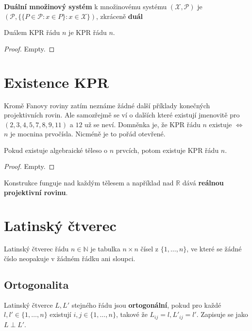 \begin{definice}
	\textbf{Duální množinový systém} k množinovému systému $(\mathcal{X}, \mathcal{P})$ je $(\mathcal{P}, \{ \{P \in \mathcal{P} : x \in P \}: x \in \mathcal{X} \})$, zkráceně \textbf{duál}
\end{definice}

\begin{tvrz}
	Duálem KPR řádu $n$ je KPR řádu $n$.
\end{tvrz}

\begin{proof}
	Empty.
\end{proof}

\section{Existence KPR}

Kromě Fanovy roviny zatím neznáme žádné další příklady konečných projektivních rovin. Ale samozřejmě se ví o dalších které existují jmenovitě pro $(2,3,4,5,7,8,9,11)$ a $12$ už se neví. Domněnka je, že KPR řádu $n$ existuje $\Leftrightarrow$ $n$ je mocnina prvočísla. Nicméně je to pořád otevřené.

\begin{veta}
	Pokud existuje algebraické těleso o $n$ prvcích, potom existuje KPR řádu $n$.
\end{veta}

\begin{proof}
	Empty.
\end{proof}

Konstrukce funguje nad každým tělesem a například nad $\mathbb{R}$ dává \textbf{reálnou projektivní rovinu}.

\section{Latinský čtverec}

\begin{definice}
	Latinský čtverec řádu $n \in \mathbb{N}$ je tabulka $n \times n$ čísel z $\{ 1, \dots, n\}$, ve které se žádné číslo neopakuje v žádném řádku ani sloupci.
\end{definice}

\subsection{Ortogonalita}

\begin{definice}
	Latinský čtverce $L, L'$ stejného řádu jsou \textbf{ortogonální}, pokud pro každé $l, l' \in \{ 1, \dots , n\}$ existují $i,j \in \{ 1, \dots , n\}$, takové že $L_{ij} = l, L'_{ij}=l'$. Zapisuje se jako $L  \perp L'$.
\end{definice}

